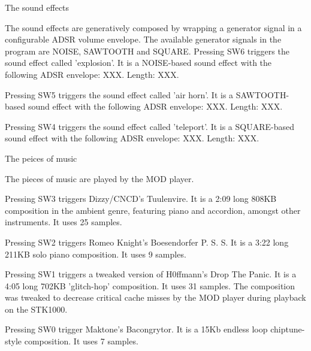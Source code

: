 The sound effects

The sound effects are generatively composed by wrapping a generator signal in a configurable ADSR volume envelope.
The available generator signals in the program are NOISE, SAWTOOTH and SQUARE.
Pressing SW6 triggers the sound effect called 'explosion'.
It is a NOISE-based sound effect with the following ADSR envelope: XXX.
Length: XXX.

Pressing SW5 triggers the sound effect called 'air horn'.
It is a SAWTOOTH-based sound effect with the following ADSR envelope: XXX.
Length: XXX.

Pressing SW4 triggers the sound effect called 'teleport'.
It is a SQUARE-based sound effect with the following ADSR envelope: XXX.
Length: XXX.


The peices of music

The pieces of music are played by the MOD player.

Pressing SW3 triggers Dizzy/CNCD's Tuulenvire.
It is a 2:09 long 808KB composition in the ambient genre, featuring piano and accordion, amongst other instruments.
It uses 25 samples.

Pressing SW2 triggers Romeo Knight's Boesendorfer P. S. S.
It is a 3:22 long 211KB solo piano composition.
It uses 9 samples.

Pressing SW1 triggers a tweaked version of H0ffmann's Drop The Panic.
It is a 4:05 long 702KB 'glitch-hop' composition.
It uses 31 samples.
The composition was tweaked to decrease critical cache misses by the MOD player during playback on the STK1000.

Pressing SW0 trigger Maktone's Bacongrytor.
It is a 15Kb endless loop chiptune-style composition.
It uses 7 samples.
